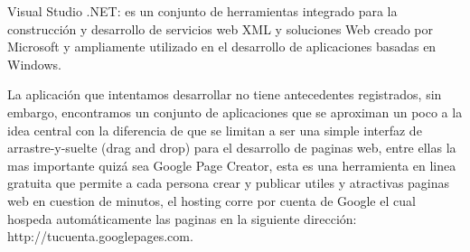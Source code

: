 Visual Studio .NET: es un conjunto de herramientas integrado para la construcción y desarrollo de servicios web XML y soluciones Web creado por Microsoft y ampliamente utilizado en el desarrollo de aplicaciones basadas en Windows.

La aplicación que intentamos desarrollar no tiene antecedentes registrados, sin embargo,  encontramos un conjunto de aplicaciones que se aproximan un poco a la idea central con la diferencia de que se limitan a ser una simple interfaz de arrastre-y-suelte (drag and drop) para el desarrollo de paginas web, entre ellas la mas importante quizá sea Google Page Creator, esta es una herramienta en linea gratuita que permite a cada persona crear y publicar utiles y atractivas paginas web en cuestion de minutos, el hosting corre por cuenta de Google el cual hospeda automáticamente las paginas en la siguiente dirección: http://tucuenta.googlepages.com.